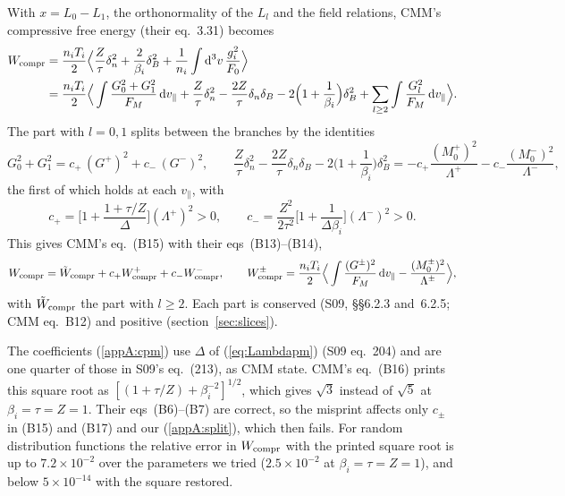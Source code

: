 With $x=L_0-L_1$, the orthonormality of the $L_l$ and the field relations, CMM's compressive free energy (their eq.~3.31) becomes
\begin{align*}
  W_{\rm compr}&=\frac{n_iT_i}{2}\Big\langle\frac{Z}{\tau}\delta_n^2+\frac{2}{\beta_i}\delta_B^2
  +\frac{1}{n_i}\int\mathrm{d}^3v\,\frac{g_i^2}{F_0}\Big\rangle\\
  &=\frac{n_iT_i}{2}\Big\langle\int\frac{G_0^2+G_1^2}{F_M}\,\mathrm{d} v_\parallel
  +\frac{Z}{\tau}\delta_n^2-\frac{2Z}{\tau}\delta_n\delta_B-2\Big(1+\frac{1}{\beta_i}\Big)\delta_B^2
  +\sum_{l\ge2}\int\frac{G_l^2}{F_M}\,\mathrm{d} v_\parallel\Big\rangle .
\end{align*}
The part with $l=0,1$ splits between the branches by the identities
\begin{equation}\label{appA:local}
  G_0^2+G_1^2=c_+\,(G^+)^2+c_-\,(G^-)^2,\qquad
  \frac{Z}{\tau}\delta_n^2-\frac{2Z}{\tau}\delta_n\delta_B-2\Big(1+\frac{1}{\beta_i}\Big)\delta_B^2
  =-c_+\frac{(M_0^+)^2}{\Lambda^+}-c_-\frac{(M_0^-)^2}{\Lambda^-},
\end{equation}
the first of which holds at each $v_\parallel$, with
\begin{equation}\label{appA:cpm}
  c_+=\Big[1+\frac{1+\tau/Z}{\Delta}\Big](\Lambda^+)^2>0,\qquad
  c_-=\frac{Z^2}{2\tau^2}\Big[1+\frac{1}{\Delta\beta_i}\Big](\Lambda^-)^2>0 .
\end{equation}
This gives CMM's eq.~(B15) with their eqs~(B13)--(B14),
\begin{equation}\label{appA:split}
  W_{\rm compr}=\tilde W_{\rm compr}+c_+W^+_{\rm compr}+c_-W^-_{\rm compr},\qquad
  W^\pm_{\rm compr}=\frac{n_iT_i}{2}\Big\langle\int\frac{(G^\pm)^2}{F_M}\,\mathrm{d} v_\parallel-\frac{(M_0^\pm)^2}{\Lambda^\pm}\Big\rangle,
\end{equation}
with $\tilde W_{\rm compr}$ the part with $l\ge2$. Each part is conserved (S09, \S\S6.2.3 and~6.2.5; CMM eq.~B12) and positive (section~\ref{sec:slices}).

The coefficients (\ref{appA:cpm}) use $\Delta$ of (\ref{eq:Lambdapm}) (S09 eq.~204) and are one quarter of those in S09's eq.~(213), as CMM state. CMM's eq.~(B16) prints this square root as $[(1+\tau/Z)+\beta_i^{-2}]^{1/2}$, which gives $\sqrt3$ instead of $\sqrt5$ at $\beta_i=\tau=Z=1$. Their eqs~(B6)--(B7) are correct, so the misprint affects only $c_\pm$ in (B15) and (B17) and our (\ref{appA:split}), which then fails. For random distribution functions the relative error in $W_{\rm compr}$ with the printed square root is up to $7.2\times10^{-2}$ over the parameters we tried ($2.5\times10^{-2}$ at $\beta_i=\tau=Z=1$), and below $5\times10^{-14}$ with the square restored.
